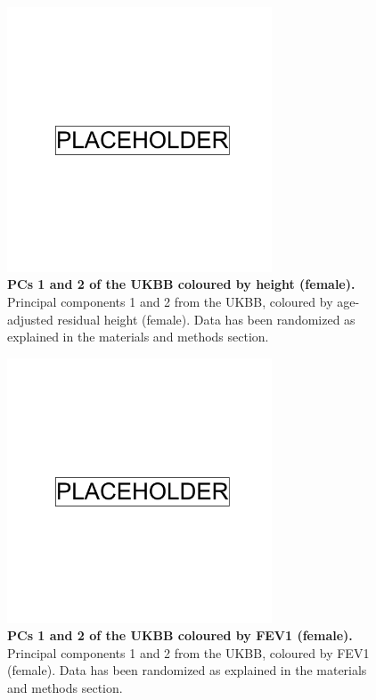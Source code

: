 \newpage

\begin{figure}[ht]
    \centering
    \includegraphics[width=0.7\textwidth]{placeholder.png}
    \caption[PCs 1 and 2 of the UKBB coloured by height (female)]{\textbf{PCs 1 and 2 of the UKBB coloured by height (female).} Principal components 1 and 2 from the UKBB, coloured by age-adjusted residual height (female). Data has been randomized as explained in the materials and methods section.}
    \label{fig:supp_ukbb_pca_height_res_f}
\end{figure}

\newpage

\begin{figure}[ht]
    \centering
    \includegraphics[width=0.7\textwidth]{placeholder.png}
    \caption[PCs 1 and 2 of the UKBB coloured by FEV1 (female)]{\textbf{PCs 1 and 2 of the UKBB coloured by FEV1 (female).} Principal components 1 and 2 from the UKBB, coloured by FEV1 (female). Data has been randomized as explained in the materials and methods section.}
    \label{fig:supp_ukbb_pca_fev_f}
\end{figure}

